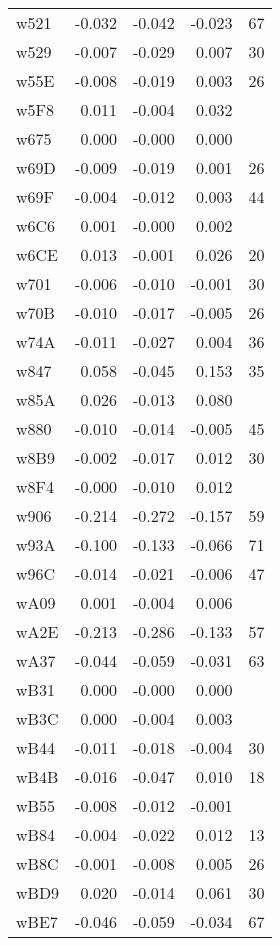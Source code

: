 \begin{table}[ht]
\begin{tabular}{lrrrr}
  w521 & -0.032 & -0.042 & -0.023 &   67 \\ 
  w529 & -0.007 & -0.029 & 0.007 &   30 \\ 
  w55E & -0.008 & -0.019 & 0.003 &   26 \\ 
  w5F8 & 0.011 & -0.004 & 0.032 &  \\ 
  w675 & 0.000 & -0.000 & 0.000 &  \\ 
  w69D & -0.009 & -0.019 & 0.001 &   26 \\ 
  w69F & -0.004 & -0.012 & 0.003 &   44 \\ 
  w6C6 & 0.001 & -0.000 & 0.002 &  \\ 
  w6CE & 0.013 & -0.001 & 0.026 &   20 \\ 
  w701 & -0.006 & -0.010 & -0.001 &   30 \\ 
  w70B & -0.010 & -0.017 & -0.005 &   26 \\ 
  w74A & -0.011 & -0.027 & 0.004 &   36 \\ 
  w847 & 0.058 & -0.045 & 0.153 &   35 \\ 
  w85A & 0.026 & -0.013 & 0.080 &  \\ 
  w880 & -0.010 & -0.014 & -0.005 &   45 \\ 
  w8B9 & -0.002 & -0.017 & 0.012 &   30 \\ 
  w8F4 & -0.000 & -0.010 & 0.012 &  \\ 
  w906 & -0.214 & -0.272 & -0.157 &   59 \\ 
  w93A & -0.100 & -0.133 & -0.066 &   71 \\ 
  w96C & -0.014 & -0.021 & -0.006 &   47 \\ 
  wA09 & 0.001 & -0.004 & 0.006 &  \\ 
  wA2E & -0.213 & -0.286 & -0.133 &   57 \\ 
  wA37 & -0.044 & -0.059 & -0.031 &   63 \\ 
  wB31 & 0.000 & -0.000 & 0.000 &  \\ 
  wB3C & 0.000 & -0.004 & 0.003 &  \\ 
  wB44 & -0.011 & -0.018 & -0.004 &   30 \\ 
  wB4B & -0.016 & -0.047 & 0.010 &   18 \\ 
  wB55 & -0.008 & -0.012 & -0.001 &  \\ 
  wB84 & -0.004 & -0.022 & 0.012 &   13 \\ 
  wB8C & -0.001 & -0.008 & 0.005 &   26 \\ 
  wBD9 & 0.020 & -0.014 & 0.061 &   30 \\ 
  wBE7 & -0.046 & -0.059 & -0.034 &   67 \\ 

\end{tabular}
\end{table}
